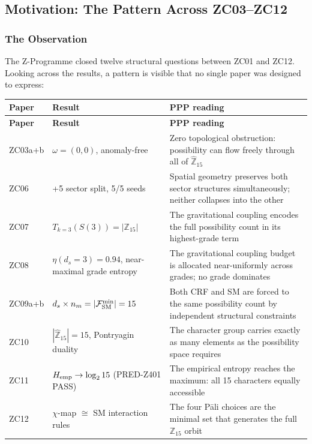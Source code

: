 \documentclass[12pt, a4paper]{article}
\begin{document}
\subsection{Motivation: The Pattern Across ZC03--ZC12}
\label{sec:motivation}

\subsubsection{The Observation}

The Z-Programme closed twelve structural questions between ZC01 and
ZC12. Looking across the results, a pattern is visible that no single
paper was designed to express:

\begin{keybox}[title={The pattern across ZC03--ZC12}]
{\small
\setlength{\LTpre}{4pt}\setlength{\LTpost}{4pt}
\renewcommand{\arraystretch}{1.30}
\begin{longtable}{>{\raggedright\arraybackslash}p{3.0cm}
                  >{\raggedright\arraybackslash}p{4.5cm}
                  >{\raggedright\arraybackslash}p{5.5cm}}
\toprule
\textbf{Paper} & \textbf{Result} & \textbf{PPP reading} \\
\midrule
\endfirsthead
\toprule
\textbf{Paper} & \textbf{Result} & \textbf{PPP reading} \\
\midrule
\endhead
\bottomrule
\endlastfoot
ZC03a+b & $\omega = (0,0)$, anomaly-free
  & Zero topological obstruction: possibility can flow freely
    through all of $\hat{\mathbb{Z}}_{15}$ \\
ZC06 & 3+5 sector split, 5/5 seeds
  & Spatial geometry preserves both sector structures simultaneously;
    neither collapses into the other \\
ZC07 & $T_{k=3}(S(3)) = |\mathbb{Z}_{15}|$
  & The gravitational coupling encodes the full possibility count in
    its highest-grade term \\
ZC08 & $\eta(d_s=3) = 0.94$, near-maximal grade entropy
  & The gravitational coupling budget is allocated near-uniformly
    across grades; no grade dominates \\
ZC09a+b & $d_s \times n_m = |\mathcal{F}_{\rm SM}^{\rm min}| = 15$
  & Both CRF and SM are forced to the same possibility count
    by independent structural constraints \\
ZC10 & $|\hat{\mathbb{Z}}_{15}| = 15$, Pontryagin duality
  & The character group carries exactly as many elements as the
    possibility space requires \\
ZC11 & $H_{\rm emp} \to \log_2 15$ (PRED-Z401 PASS)
  & The empirical entropy reaches the maximum: all 15 characters
    equally accessible \\
ZC12 & $\chi$-map $\cong$ SM interaction rules
  & The four Pāli choices are the minimal set that generates the
    full $\mathbb{Z}_{15}$ orbit \\
\end{longtable}
}
\end{keybox}
\end{document}
